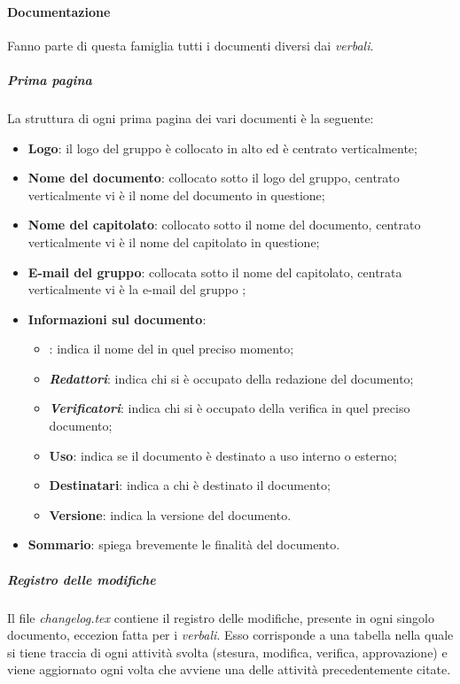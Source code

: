 \paragraph{Documentazione}
Fanno parte di questa famiglia tutti i documenti diversi dai \textit{verbali}.
\subparagraph{Prima pagina}
La struttura di ogni prima pagina dei vari documenti è la seguente:
\begin {itemize}
\item \textbf{Logo}: il logo del gruppo \groupName{} è collocato in alto ed è centrato verticalmente;
\item \textbf{Nome del documento}: collocato sotto il logo del gruppo, centrato verticalmente vi è il nome del documento in questione;
\item \textbf{Nome del capitolato}: collocato sotto il nome del documento, centrato verticalmente vi è il nome del capitolato in questione;
\item \textbf{E-mail del gruppo}: collocata sotto il nome del capitolato, centrata verticalmente vi è la e-mail del gruppo \groupName{};
\item \textbf{Informazioni sul documento}:
\begin{itemize}
    \item \textbf{\roleProjectManager}: indica il nome del \roleProjectManagerLow{} in quel preciso momento;
    \item \textbf{\textit{Redattori}}: indica chi si è occupato della redazione del documento;
    \item \textbf{\textit{Verificatori}}: indica chi si è occupato della verifica in quel preciso documento;
    \item \textbf{Uso}: indica se il documento è destinato a uso interno o esterno;
    \item \textbf{Destinatari}: indica a chi è destinato il documento;
    \item \textbf{Versione}: indica la versione del documento.
\end{itemize}
\item \textbf{Sommario}: spiega brevemente le finalità del documento.
\end {itemize}
\subparagraph{Registro delle modifiche}
Il file \textit{changelog.tex} contiene il registro delle modifiche, presente in ogni singolo documento, eccezion fatta per i \textit{verbali}.
Esso corrisponde a una tabella nella quale si tiene traccia di ogni attività svolta (stesura, modifica, verifica, approvazione) e viene aggiornato ogni volta che avviene una delle attività precedentemente citate.
